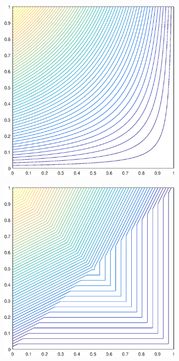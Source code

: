 \begin{figure}
\label{fig::2D_Summary_unit_square_basis_functions}
\centering
	\begin{subfigure}[b]{0.35\textwidth}
		\centering
		\includegraphics[width=\textwidth]{figures/sec_BF/square_WACHSPRESS1_contour_b4.eps}
		\caption{}
	\end{subfigure}
	\hspace{1cm}
	\begin{subfigure}[b]{0.35\textwidth}
		\centering
		\includegraphics[width=\textwidth]{figures/sec_BF/square_PWLD1_contour_b4.eps}

\end{subfigure}
\end{figure}
